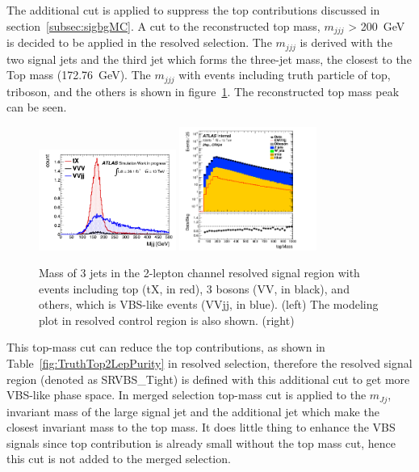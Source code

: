 The additional cut is applied to suppress the top contributions discussed in section~\ref{subsec:sigbgMC}. A cut to the reconstructed top mass, $m_{jjj}$ > 200~GeV is decided to be applied in the resolved selection. The $m_{jjj}$ is derived with the two signal jets and the third jet which forms the three-jet mass, the closest to the Top mass (172.76~GeV). The $m_{jjj}$ with events including truth particle of top, triboson, and the others is shown in figure~\ref{fig:2leptopMass}. The reconstructed top mass peak can be seen.
\begin{figure}[H]
    \begin{center}
      \includegraphics[width=0.4\textwidth]{figures/2lep/topMass/WZjjtopMasspeak}
      \includegraphics[width=0.4\textwidth]{figures/2lep/dataMC/C_0ptag2pjet_0ptv_CRVjet_topMass_Log}
        \caption{ Mass of 3 jets in the 2-lepton channel resolved signal region with events including top (tX, in red), 3 bosons (VV, in black), and others, which is VBS-like events (VVjj, in blue). (left) The modeling plot in resolved control region is also shown. (right)}
        \label{fig:2leptopMass}
    \end{center}
\end{figure}
This top-mass cut can reduce the top contributions, as shown in Table~\ref{fig:TruthTop2LepPurity} in resolved selection, therefore the resolved signal region (denoted as SRVBS\_Tight) is defined with this additional cut to get more VBS-like phase space. In merged selection top-mass cut is applied to the $m_{Jj}$, invariant mass of the large signal jet and the additional jet which make the closest invariant mass to the top mass. It does little thing to enhance the VBS signals since top contribution is already small without the top mass cut, hence this cut is not added to the merged selection.
